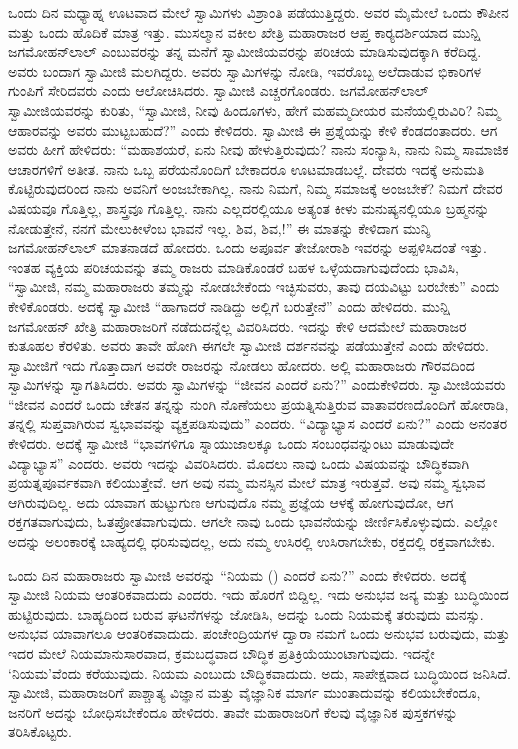  ಒಂದು ದಿನ ಮಧ್ಯಾಹ್ನ ಊಟವಾದ ಮೇಲೆ ಸ್ವಾಮಿಗಳು ವಿಶ್ರಾಂತಿ ಪಡೆಯುತ್ತಿದ್ದರು. ಅವರ ಮೈಮೇಲೆ ಒಂದು ಕೌಪೀನ ಮತ್ತು ಒಂದು ಹೊದಿಕೆ ಮಾತ್ರ ಇತ್ತು. ಮುಸಲ್ಮಾನ ವಕೀಲ ಖೇತ್ರಿ ಮಹಾರಾಜರ ಆಪ್ತ ಕಾರ‍್ಯದರ್ಶಿಯಾದ ಮುನ್ಷಿ ಜಗಮೋಹನ್‍ಲಾಲ್ ಎಂಬುವರನ್ನು ತನ್ನ ಮನೆಗೆ ಸ್ವಾಮೀಜಿಯವರನ್ನು ಪರಿಚಯ ಮಾಡಿಸುವುದಕ್ಕಾಗಿ ಕರೆದಿದ್ದ. ಅವರು ಬಂದಾಗ ಸ್ವಾಮೀಜಿ ಮಲಗಿದ್ದರು. ಅವರು ಸ್ವಾಮಿಗಳನ್ನು ನೋಡಿ, ಇವರೊಬ್ಬ ಅಲೆದಾಡುವ ಭಿಕಾರಿಗಳ ಗುಂಪಿಗೆ ಸೇರಿದವರು ಎಂದು ಆಲೋಚಿಸಿದರು. ಸ್ವಾಮೀಜಿ ಎಚ್ಚರಗೊಂಡರು. ಜಗಮೋಹನ್‍ಲಾಲ್ ಸ್ವಾಮೀಜಿಯವರನ್ನು ಕುರಿತು, “ಸ್ವಾಮೀಜಿ, ನೀವು ಹಿಂದೂಗಳು, ಹೇಗೆ ಮಹಮ್ಮದೀಯರ ಮನೆಯಲ್ಲಿರುವಿರಿ? ನಿಮ್ಮ ಆಹಾರವನ್ನು ಅವರು ಮುಟ್ಟಬಹುದೆ?” ಎಂದು ಕೇಳಿದರು. ಸ್ವಾಮೀಜಿ ಈ ಪ್ರಶ್ನೆಯನ್ನು ಕೇಳಿ ಕೆಂಡದಂತಾದರು. ಆಗ ಅವರು ಹೀಗೆ ಹೇಳಿದರು: “ಮಹಾಶಯರೆ, ಏನು ನೀವು ಹೇಳುತ್ತಿರುವುದು? ನಾನು ಸಂನ್ಯಾಸಿ, ನಾನು ನಿಮ್ಮ ಸಾಮಾಜಿಕ ಆಚಾರಗಳಿಗೆ ಅತೀತ. ನಾನು ಒಬ್ಬ ಪರೆಯನೊಂದಿಗೆ ಬೇಕಾದರೂ ಊಟಮಾಡಬಲ್ಲೆ. ದೇವರು ಇದಕ್ಕೆ ಅನುಮತಿ ಕೊಟ್ಟಿರುವುದರಿಂದ ನಾನು ಅವನಿಗೆ ಅಂಜಬೇಕಾಗಿಲ್ಲ. ನಾನು ನಿಮಗೆ, ನಿಮ್ಮ ಸಮಾಜಕ್ಕೆ ಅಂಜಬೇಕೆ? ನಿಮಗೆ ದೇವರ ವಿಷಯವೂ ಗೊತ್ತಿಲ್ಲ, ಶಾಸ್ತ್ರವೂ ಗೊತ್ತಿಲ್ಲ. ನಾನು ಎಲ್ಲದರಲ್ಲಿಯೂ ಅತ್ಯಂತ ಕೀಳು ಮನುಷ್ಯನಲ್ಲಿಯೂ ಬ್ರಹ್ಮನನ್ನು ನೋಡುತ್ತೇನೆ, ನನಗೆ ಮೇಲುಕೀಳೆಂಬ ಭಾವನೆ ಇಲ್ಲ. ಶಿವ, ಶಿವ,!” ಈ ಮಾತನ್ನು ಕೇಳಿದಾಗ ಮುನ್ಶಿ ಜಗಮೋಹನ್‍ಲಾಲ್ ಮಾತನಾಡದೆ ಹೋದರು. ಒಂದು ಅಪೂರ್ವ ತೇಜೋರಾಶಿ ಇವರನ್ನು ಅಪ್ಪಳಿಸಿದಂತೆ ಇತ್ತು. ಇಂತಹ ವ್ಯಕ್ತಿಯ ಪರಿಚಯವನ್ನು ತಮ್ಮ ರಾಜರು ಮಾಡಿಕೊಂಡರೆ ಬಹಳ ಒಳ್ಳೆಯದಾಗುವುದೆಂದು ಭಾವಿಸಿ, “ಸ್ವಾಮೀಜಿ, ನಮ್ಮ ಮಹಾರಾಜರು ತಮ್ಮನ್ನು ನೋಡಬೇಕೆಂದು ಇಚ್ಛಿಸುವರು, ತಾವು ದಯವಿಟ್ಟು ಬರಬೇಕು” ಎಂದು ಕೇಳಿಕೊಂಡರು. ಅದಕ್ಕೆ ಸ್ವಾಮೀಜಿ “ಹಾಗಾದರೆ ನಾಡಿದ್ದು ಅಲ್ಲಿಗೆ ಬರುತ್ತೇನೆ” ಎಂದು ಹೇಳಿದರು. ಮುನ್ಷಿ ಜಗಮೋಹನ್ ಖೇತ್ರಿ ಮಹಾರಾಜರಿಗೆ ನಡೆದುದನ್ನೆಲ್ಲ ವಿವರಿಸಿದರು. ಇದನ್ನು ಕೇಳಿ ಆದಮೇಲೆ ಮಹಾರಾಜರ ಕುತೂಹಲ ಕೆರಳಿತು. ಅವರು ತಾವೇ ಹೋಗಿ ಈಗಲೇ ಸ್ವಾಮೀಜಿ ದರ್ಶನವನ್ನು ಪಡೆಯುತ್ತೇನೆ ಎಂದು ಹೇಳಿದರು. ಸ್ವಾಮೀಜಿಗೆ ಇದು ಗೊತ್ತಾದಾಗ ಅವರೇ ರಾಜರನ್ನು ನೋಡಲು ಹೋದರು. ಅಲ್ಲಿ ಮಹಾರಾಜರು ಗೌರವದಿಂದ ಸ್ವಾಮಿಗಳನ್ನು ಸ್ವಾಗತಿಸಿದರು. ಅವರು ಸ್ವಾಮಿಗಳನ್ನು “ಜೀವನ ಎಂದರೆ ಏನು?” ಎಂದು\break ಕೇಳಿದರು. ಸ್ವಾಮೀಜಿಯವರು “ಜೀವನ ಎಂದರೆ ಒಂದು ಚೇತನ ತನ್ನನ್ನು ನುಂಗಿ ನೊಣೆಯಲು ಪ್ರಯತ್ನಿಸುತ್ತಿರುವ ವಾತಾವರಣದೊಂದಿಗೆ ಹೋರಾಡಿ, ತನ್ನಲ್ಲಿ ಸುಪ್ತವಾಗಿರುವ ಸ್ವಭಾವವನ್ನು ವ್ಯಕ್ತಪಡಿಸುವುದು” ಎಂದರು. “ವಿದ್ಯಾಭ್ಯಾಸ ಎಂದರೆ ಏನು?” ಎಂದು ಅನಂತರ ಕೇಳಿದರು. ಅದಕ್ಕೆ ಸ್ವಾಮೀಜಿ “ಭಾವಗಳಿಗೂ ಸ್ನಾಯುಜಾಲಕ್ಕೂ ಒಂದು ಸಂಬಂಧವನ್ನುಂಟು ಮಾಡುವುದೇ ವಿದ್ಯಾಭ್ಯಾಸ” ಎಂದರು. ಅವರು ಇದನ್ನು ವಿವರಿಸಿದರು. ಮೊದಲು ನಾವು ಒಂದು ವಿಷಯವನ್ನು ಬೌದ್ಧಿಕವಾಗಿ ಪ್ರಯತ್ನಪೂರ್ವಕವಾಗಿ ಕಲಿಯುತ್ತೇವೆ. ಆಗ ಅವು ನಮ್ಮ ಮನಸ್ಸಿನ ಮೇಲೆ ಮಾತ್ರ ಇರುತ್ತವೆ. ಅವು ನಮ್ಮ ಸ್ವಭಾವ ಆಗಿರುವುದಿಲ್ಲ. ಅದು ಯಾವಾಗ ಹುಟ್ಟುಗುಣ ಆಗುವುದೊ ನಮ್ಮ ಪ್ರಜ್ಞೆಯ ಆಳಕ್ಕೆ ಹೋಗುವುದೋ, ಆಗ ರಕ್ತಗತವಾಗುವುದು, ಓತಪ್ರೋತವಾಗುವುದು. ಆಗಲೇ ನಾವು ಒಂದು ಭಾವನೆಯನ್ನು ಜೀರ್ಣಿಸಿಕೊಳ್ಳುವುದು. ಎಲ್ಲೋ ಅದನ್ನು ಅಲಂಕಾರಕ್ಕೆ ಬಾಹ್ಯದಲ್ಲಿ ಧರಿಸುವುದಲ್ಲ, ಅದು ನಮ್ಮ ಉಸಿರಲ್ಲಿ ಉಸಿರಾಗಬೇಕು, ರಕ್ತದಲ್ಲಿ ರಕ್ತವಾಗಬೇಕು. 

\vskip 2pt

 ಒಂದು ದಿನ ಮಹಾರಾಜರು ಸ್ವಾಮೀಜಿ ಅವರನ್ನು “ನಿಯಮ () ಎಂದರೆ ಏನು?” ಎಂದು ಕೇಳಿದರು. ಅದಕ್ಕೆ ಸ್ವಾಮೀಜಿ ನಿಯಮ ಆಂತರಿಕವಾದುದು ಎಂದರು. ಇದು ಹೊರಗೆ ಬಿದ್ದಿಲ್ಲ. ಇದು ಅನುಭವ ಜನ್ಯ ಮತ್ತು ಬುದ್ಧಿಯಿಂದ ಹುಟ್ಟಿರುವುದು. ಬಾಹ್ಯದಿಂದ ಬರುವ ಘಟನೆಗಳನ್ನು ಜೋಡಿಸಿ, ಅದನ್ನು ಒಂದು ನಿಯಮಕ್ಕೆ ತರುವುದು ಮನಸ್ಸು. ಅನುಭವ ಯಾವಾಗಲೂ ಆಂತರಿಕವಾದುದು. ಪಂಚೇಂದ್ರಿಯಗಳ ದ್ವಾರಾ ನಮಗೆ ಒಂದು ಅನುಭವ ಬರುವುದು, ಮತ್ತು ಇದರ ಮೇಲೆ ನಿಯಮಾನುಸಾರವಾದ, ಕ್ರಮಬದ್ಧವಾದ ಬೌದ್ಧಿಕ ಪ್ರತಿಕ್ರಿಯೆಯುಂಟಾಗುವುದು. ಇದನ್ನೇ ‘ನಿಯಮ’ವೆಂದು ಕರೆಯುವುದು. ನಿಯಮ ಎಂಬುದು ಬೌದ್ಧಿಕವಾದುದು. ಅದು, ಸಾಪೇಕ್ಷವಾದ ಬುದ್ಧಿಯಿಂದ ಜನಿಸಿದೆ. ಸ್ವಾಮೀಜಿ, ಮಹಾರಾಜರಿಗೆ ಪಾಶ್ಚಾತ್ಯ ವಿಜ್ಞಾನ ಮತ್ತು ವೈಜ್ಞಾನಿಕ ಮಾರ್ಗ ಮುಂತಾದುವನ್ನು ಕಲಿಯಬೇಕೆಂದೂ, ಜನರಿಗೆ ಅದನ್ನು ಬೋಧಿಸಬೇಕೆಂದೂ ಹೇಳಿದರು. ತಾವೇ ಮಹಾರಾಜರಿಗೆ ಕೆಲವು ವೈಜ್ಞಾನಿಕ ಪುಸ್ತಕಗಳನ್ನು ತರಿಸಿಕೊಟ್ಟರು. 

